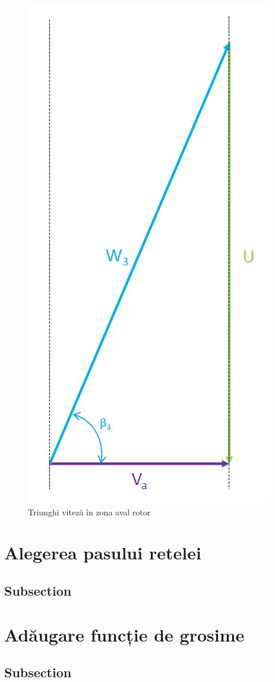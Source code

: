 \begin{figure}[t!]
	\centering
	\includegraphics[scale=0.5]{figures/triunghi_viteza_ZAR.jpg}
	\caption{Triunghi viteză în zona aval rotor}
	\label{Triunghi viteză în zona aval rotor}
\end{figure}

\clearpage

\section{Alegerea pasului retelei}

\subsection{Subsection}


\section{Adăugare funcție de grosime}

\subsection{Subsection}